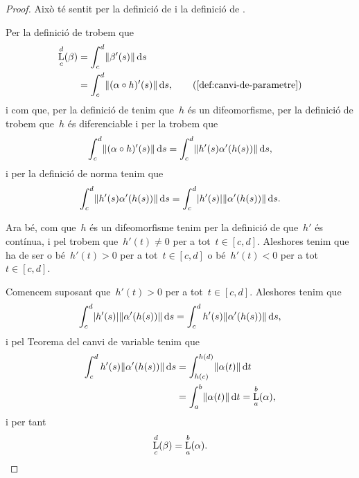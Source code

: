 \documentclass[../geometria-diferencial.tex]{subfiles}
\begin{document}
    \begin{proof}
        Això té sentit per la definició de  i la definició de .

        Per la definició de  trobem que
        \begin{align*}
            \Long_{c}^{d}(\beta)&=\int_{c}^{d}\norm{\beta'(s)}\diff s \\
            &=\int_{c}^{d}\norm{(\alpha\circ h)'(s)}\diff s, \tag{\ref{def:canvi-de-parametre}}
        \end{align*}
        i com que, per la definició de  tenim que~\(h\) és un difeomorfisme, per la definició de  trobem que~\(h\) és diferenciable i per la  trobem que
        \[
            \int_{c}^{d}\norm{(\alpha\circ h)'(s)}\diff s=\int_{c}^{d}\norm{h'(s)\alpha'(h(s))}\diff s,
        \]
        i per la definició de norma tenim que%
        \[
            \int_{c}^{d}\norm{h'(s)\alpha'(h(s))}\diff s=\int_{c}^{d}\abs{h'(s)}\norm{\alpha'(h(s))}\diff s.
        \]

        Ara bé, com que~\(h\) és un difeomorfisme tenim per la definició de  que~\(h'\) és contínua, i pel \corollari{}  trobem que~\(h'(t)\neq0\) per a tot~\(t\in[c,d]\).
        Aleshores tenim que ha de ser o bé~\(h'(t)>0\) per a tot~\(t\in[c,d]\) o bé~\(h'(t)<0\) per a tot~\(t\in[c,d]\).

        Comencem suposant que~\(h'(t)>0\) per a tot~\(t\in[c,d]\).
        Aleshores tenim que
        \[
            \int_{c}^{d}\abs{h'(s)}\norm{\alpha'(h(s))}\diff s=\int_{c}^{d}h'(s)\norm{\alpha'(h(s))}\diff s,
        \]
        i pel Teorema del canvi de variable tenim que %
        \begin{align*}
            \int_{c}^{d}h'(s)\norm{\alpha'(h(s))}\diff s&=\int_{h(c)}^{h(d)}\norm{\alpha(t)}\diff t \\
            &=\int_{a}^{b}\norm{\alpha(t)}\diff t=\Long_{a}^{b}(\alpha),
        \end{align*}
        i per tant
        \[
            \operatorname*{L}_{c}^{d}(\beta)=\operatorname*{L}_{a}^{b}(\alpha).
        \]


\end{proof}
\end{document}
